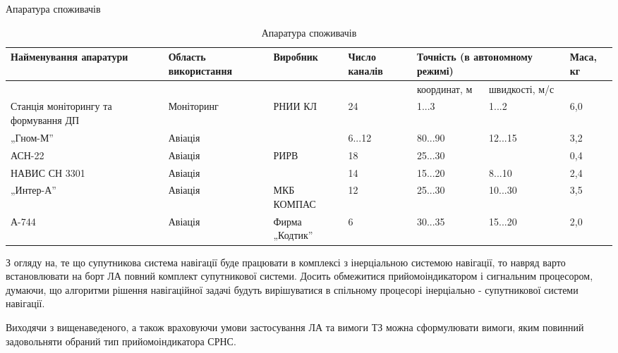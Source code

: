 Апаратура споживачів
\begin{table}[here]
\small
\caption{Апаратура споживачів}
\centering
\begin{tabular}{|p{30mm}|p{20mm}|p{20mm}|p{20mm}|p{20mm}|p{20mm}|p{10mm}|} \hline 
Найменування апаратури & Область використання & Виробник & Число каналів & 
\multicolumn{2}{|p{30mm}|}{Точність (в автономному режимі)} & Маса, кг \\ \hline 
 &  &  &  & координат, м & швидкості, м/с &  \\ \hline 
Станція моніторингу та формування ДП & Моніторинг & РНИИ КЛ & 24 & 1...3 & 1...2 & 6,0 \\ \hline 
„Гном-М'' & Авіація &  & 6...12 & 80...90 & 12...15 & 3,2 \\ \hline 
АСН-22 & Авіація & РИРВ & 18 & 25...30 &  & 0,4 \\ \hline 
НАВИС СН 3301 & Авіація &  & 14 & 15...20 & 8...10 & 2,4 \\ \hline 
„Интер-А'' & Авіація & МКБ КОМПАС & 12 & 25...30 & 10...30 & 3,5 \\ \hline 
А-744 & Авіація & Фирма „Кодтик'' & 6 & 30...35 & 15...20 & 2,0 \\ \hline 
\end{tabular}
\label{tb:ac}
\end{table}


З огляду на, те що  супутникова система навігації буде працювати в комплексі з 
інерціальною системою навігації, то навряд варто встановлювати  на борт ЛА повний 
комплект супутникової системи. Досить обмежитися  прийомоіндикатором і сигнальним 
процесором, думаючи, що алгоритми рішення навігаційної задачі будуть вирішуватися 
в спільному процесорі інерціально - супутникової системи навігації. 

Виходячи з вищенаведеного, а також враховуючи умови застосування ЛА та вимоги 
ТЗ можна сформулювати вимоги, яким повинний задовольняти обраний тип прийомоіндикатора 
СРНС. 

